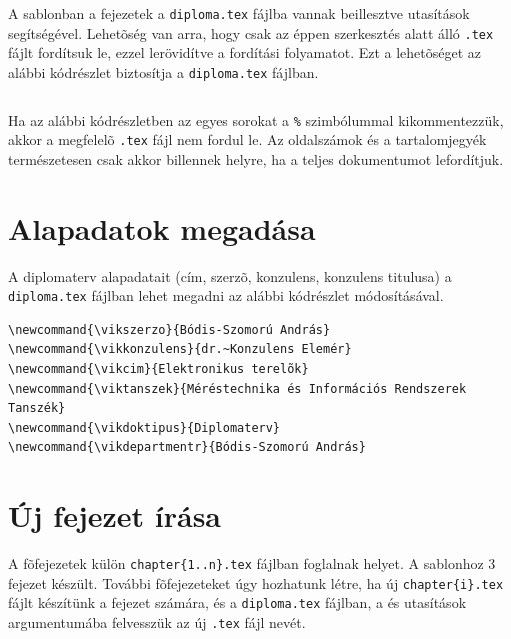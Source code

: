 A sablonban a fejezetek a \verb+diploma.tex+ fájlba vannak beillesztve \verb++ utasítások segítségével. Lehetõség van arra, hogy csak az éppen szerkesztés alatt álló \verb+.tex+ fájlt fordítsuk le, ezzel lerövidítve a fordítási folyamatot. Ezt a lehetõséget az alábbi kódrészlet biztosítja a \verb+diploma.tex+ fájlban.
\begin{lstlisting}[frame=single,float=!ht]

\end{lstlisting}

Ha az alábbi kódrészletben az egyes sorokat a \verb+%+ szimbólummal kikommentezzük, akkor a megfelelõ \verb+.tex+ fájl nem fordul le. Az oldalszámok és a tartalomjegyék természetesen csak akkor billennek helyre, ha a teljes dokumentumot lefordítjuk.

\newpage
\section{Alapadatok megadása}
A diplomaterv alapadatait (cím, szerzõ, konzulens, konzulens titulusa) a \verb+diploma.tex+ fájlban lehet megadni az alábbi kódrészlet módosításával.
\begin{lstlisting}[frame=single,float=!ht]
\newcommand{\vikszerzo}{Bódis-Szomorú András}
\newcommand{\vikkonzulens}{dr.~Konzulens Elemér}
\newcommand{\vikcim}{Elektronikus terelõk}
\newcommand{\viktanszek}{Méréstechnika és Információs Rendszerek Tanszék}
\newcommand{\vikdoktipus}{Diplomaterv}
\newcommand{\vikdepartmentr}{Bódis-Szomorú András}
\end{lstlisting}

\section{Új fejezet írása}
A fõfejezetek külön \verb+chapter{1..n}.tex+ fájlban foglalnak helyet. A sablonhoz 3 fejezet készült. További fõfejezeteket úgy hozhatunk létre, ha új \verb+chapter{i}.tex+ fájlt készítünk a fejezet számára, és a \verb+diploma.tex+ fájlban, a \verb++ és \verb++ utasítások argumentumába felvesszük az új \verb+.tex+ fájl nevét.





